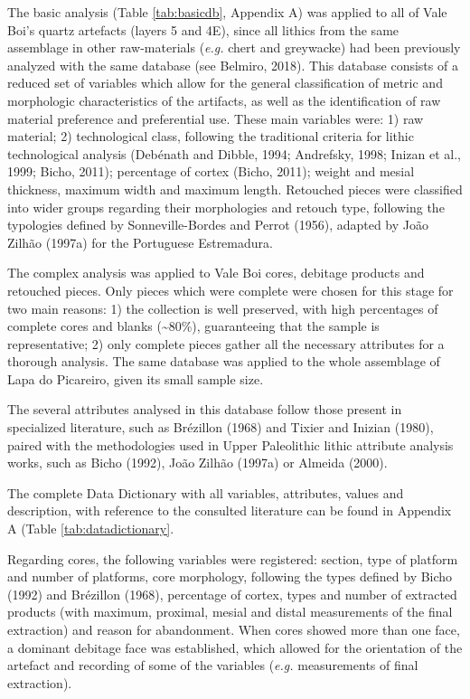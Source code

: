 \documentclass[12pt,twoside]{reedthesis}
\begin{document}
The basic analysis (Table \ref{tab:basicdb}, Appendix A) was applied to all of Vale Boi's quartz artefacts (layers 5 and 4E), since all lithics from the same assemblage in other raw-materials (\emph{e.g.} chert and greywacke) had been previously analyzed with the same database (see Belmiro, 2018). This database consists of a reduced set of variables which allow for the general classification of metric and morphologic characteristics of the artifacts, as well as the identification of raw material preference and preferential use. These main variables were: 1) raw material; 2) technological class, following the traditional criteria for lithic technological analysis (Debénath and Dibble, 1994; Andrefsky, 1998; Inizan et al., 1999; Bicho, 2011); percentage of cortex (Bicho, 2011); weight and mesial thickness, maximum width and maximum length. Retouched pieces were classified into wider groups regarding their morphologies and retouch type, following the typologies defined by Sonneville-Bordes and Perrot (1956), adapted by João Zilhão (1997a) for the Portuguese Estremadura.

The complex analysis was applied to Vale Boi cores, debitage products and retouched pieces. Only pieces which were complete were chosen for this stage for two main reasons: 1) the collection is well preserved, with high percentages of complete cores and blanks (\textasciitilde80\%), guaranteeing that the sample is representative; 2) only complete pieces gather all the necessary attributes for a thorough analysis. The same database was applied to the whole assemblage of Lapa do Picareiro, given its small sample size.

The several attributes analysed in this database follow those present in specialized literature, such as Brézillon (1968) and Tixier and Inizian (1980), paired with the methodologies used in Upper Paleolithic lithic attribute analysis works, such as Bicho (1992), João Zilhão (1997a) or Almeida (2000).

The complete Data Dictionary with all variables, attributes, values and description, with reference to the consulted literature can be found in Appendix A (Table \ref{tab:datadictionary}.

Regarding cores, the following variables were registered: section, type of platform and number of platforms, core morphology, following the types defined by Bicho (1992) and Brézillon (1968), percentage of cortex, types and number of extracted products (with maximum, proximal, mesial and distal measurements of the final extraction) and reason for abandonment. When cores showed more than one face, a dominant debitage face was established, which allowed for the orientation of the artefact and recording of some of the variables (\emph{e.g.} measurements of final extraction).
\end{document}
